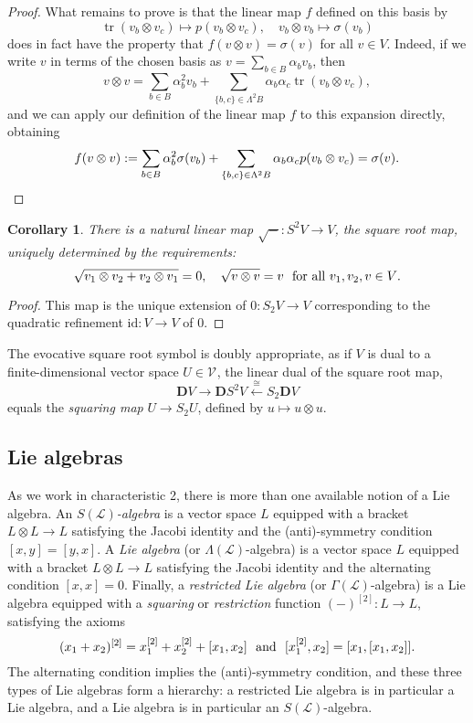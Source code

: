 \documentclass[11pt]{amsart} \renewcommand{\baselinestretch}{1.4}
\theoremstyle{plain}
\newtheorem{cor}[thm]{Corollary}
\theoremstyle{definition}
\DeclareMathOperator{\trace}{tr}
\newcommand{\DASH}{\mathrm{-}}
\renewcommand{\to}{\longrightarrow}
\newcommand{\from}{\longleftarrow}
\newcommand{\scrL}{\mathscr{L}}
\newcommand{\calV}{\mathcal{V}}
\newcommand{\LieOperad}{{\scrL}}
\newcommand{\restn}[1]{#1^{[2]}}
\newcommand{\vect}[2]{\calV^{#1}_{#2}}
\newcommand{\Id}{\mathrm{id}}
\newcommand{\dual}{\mathbf{D}}
\renewcommand{\mapsto}{\longmapsto}
\begin{document}
\begin{Conventions and notation}
\begin{proof}
What remains to prove is that the linear map $f$ defined on this basis by
\[\trace(v_b\otimes v_c)\mapsto p(v_b\otimes v_c),\quad v_b\otimes v_b\mapsto \sigma(v_b)\]
does in fact have the property that $f(v\otimes v)=\sigma(v)$ for \textup{all} $v\in V$. Indeed, if we write $v$ in terms of the chosen basis as $v=\sum_{b\in B}\alpha_bv_b$, then
\[v\otimes v
=
\sum_{b\in B}\alpha_b^2v_b+\sum_{\{b,c\}\in \Lambda^2B}\alpha_b\alpha_c\trace(v_b\otimes v_c),\]
and we can apply our definition of the linear map $f$ to this expansion directly, obtaining
\[f(v\otimes v):=
\sum_{b\in B}\alpha_b^2\sigma(v_b)+\sum_{\{b,c\}\in \Lambda^2B}\alpha_b\alpha_cp(v_b\otimes v_c)=\sigma(v).\qedhere\]
\end{proof}
\begin{cor}
There is a natural linear map $\sqrt{\DASH}:S^2V\to V$, the \emph{square root map}, uniquely determined by the requirements:
\[\sqrt{v_1\otimes v_2+v_2\otimes v_1}=0,\ \ \ \sqrt{v\otimes v}=v \textup{ \ for all $v_1,v_2,v\in V$}.\]
\end{cor}
\begin{proof}
This map is the unique extension of $0:S_2V\to V$ corresponding to the quadratic refinement $\Id:V\to V$ of $0$.
\end{proof}
\noindent The evocative square root symbol is doubly appropriate, as if $V$ is dual to a finite-dimensional vector space $U\in\vect{}{}$, the linear dual of the square root map,
\[\dual V\to \dual S^2V\overset{\cong }{\from}S_2\dual V\]
equals the \emph{squaring map} $U\to S_2U$, defined by $u\mapsto u\otimes u$.


\subsection{Lie algebras}
\label{introtoLiealgssection}
As we work in characteristic 2, there is more than one available notion of a Lie algebra. An \emph{$S(\LieOperad)$-algebra} is a vector space $L$ equipped with a bracket $L\otimes L\to L$ satisfying the Jacobi identity and the (anti)-symmetry condition $[x,y]=[y,x]$. A \emph{Lie algebra} (or $\Lambda(\LieOperad)$-algebra) is a vector space $L$ equipped with a bracket $L\otimes L\to L$ satisfying the Jacobi identity and the alternating condition $[x,x]=0$. Finally, a \emph{restricted Lie algebra} \cite{CurtisSimplicialHtpy.pdf,6Author.pdf} (or $\Gamma(\LieOperad)$-algebra) is a Lie algebra equipped with a \emph{squaring} or \emph{restriction} function $\restn{(\DASH)}:L\to L$, satisfying the axioms
\[\restn{(x_1+x_2)}=\restn{x_1}+\restn{x_2}+[x_1,x_2]\textup{ \ and \ }[\restn{x_1},x_2]=[x_1,[x_1,x_2]].\]
The alternating condition implies the (anti)-symmetry condition, and these three types of Lie algebras form a hierarchy: a restricted Lie algebra is in particular a Lie algebra, and a Lie algebra is in particular an $S(\LieOperad)$-algebra.


\end{Conventions and notation}
\end{document}
